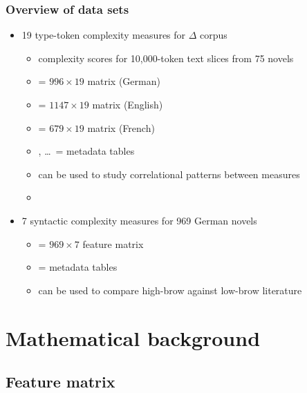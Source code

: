 \documentclass[t]{beamer} %
\begin{document}
\begin{frame}
  \frametitle{Overview of data sets}

  \begin{itemize}
  \item 19 type-token complexity measures for $\Delta$ corpus
    \begin{itemize}
    \item complexity scores for 10,000-token text slices from 75 novels 
    \item {} = $996\times 19$ matrix (German)
    \item {} = $1147\times 19$ matrix (English)
    \item {} = $679\times 19$ matrix (French)
    \item {}, \ldots\ = metadata tables
    \item can be used to study correlational patterns between measures
    \item[]
    \end{itemize}
  \item 7 syntactic complexity measures for 969 German novels
    \begin{itemize}
    \item {} = $969\times 7$ feature matrix
    \item {} = metadata tables
    \item can be used to compare high-brow against low-brow literature
    \end{itemize}
  \end{itemize}  
\end{frame}


\section{Mathematical background}

\subsection{Feature matrix}
\end{document}

